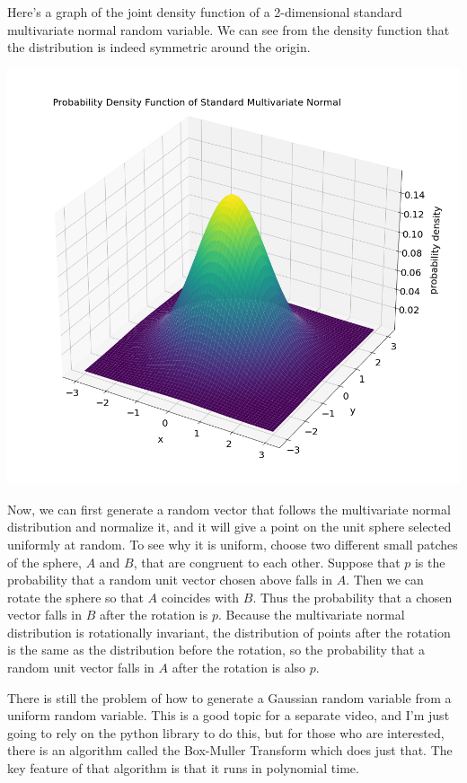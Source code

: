 \documentclass{article}
\begin{document}
Here's a graph of the joint density function of a 2-dimensional standard multivariate normal random variable. We can see from the density function that the distribution is indeed symmetric around the origin.

\begin{center}
    \includegraphics[scale=0.3]{manim/project/images/Multivariate Normal PDF.png}
\end{center}

Now, we can first generate a random vector that follows the multivariate normal distribution and normalize it, and it will give a point on the unit sphere selected uniformly at random. To see why it is uniform, choose two different small patches of the sphere, $A$ and $B$, that are congruent to each other. Suppose that $p$ is the probability that a random unit vector chosen above falls in $A$. Then we can rotate the sphere so that $A$ coincides with $B$. Thus the probability that a chosen vector falls in $B$ after the rotation is $p$. Because the multivariate normal distribution is rotationally invariant, the distribution of points after the rotation is the same as the distribution before the rotation, so the probability that a random unit vector falls in $A$ after the rotation is also $p$.

There is still the problem of how to generate a Gaussian random variable from a uniform random variable. This is a good topic for a separate video, and I'm just going to rely on the python library to do this, but for those who are interested, there is an algorithm called the Box-Muller Transform which does just that. The key feature of that algorithm is that it runs in polynomial time.
\end{document}
